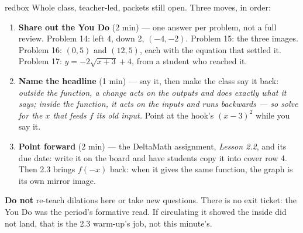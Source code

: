 \documentclass[10pt]{article}
\begin{document}
\boxguard[20]
\begin{skillbox}{redbox}
Whole class, teacher-led, packets still open. Three moves, in order:
\begin{enumerate}[itemsep=3pt]
  \item \textbf{Share out the You Do} (2 min) --- one answer per problem, not a full review.
        Problem 14: left 4, down 2, $(-4, -2)$. Problem 15: the three images. Problem 16:
        $(0, 5)$ and $(12, 5)$, each with the equation that settled it. Problem 17:
        $y = -2\sqrt{x + 3} + 4$, from a student who reached it.
  \item \textbf{Name the headline} (1 min) --- say it, then make the class say it back:
        \textit{outside the function, a change acts on the outputs and does exactly what it
        says; inside the function, it acts on the inputs and runs backwards --- so solve for
        the $x$ that feeds $f$ its old input.} Point at the hook's $(x - 3)^2$ while you say it.
  \item \textbf{Point forward} (2 min) --- the DeltaMath assignment, \textit{Lesson 2.2}, and its
        due date: write it on the board and have students copy it into cover row 4. Then 2.3
        brings $f(-x)$ back: when it gives the same function, the graph is its own mirror
        image.
\end{enumerate}
\textbf{Do not} re-teach dilations here or take new questions. There is no exit ticket: the
You Do was the period's formative read. If circulating it showed the inside
did not land, that is the 2.3 warm-up's job, not this minute's.
\end{skillbox}
\end{document}
